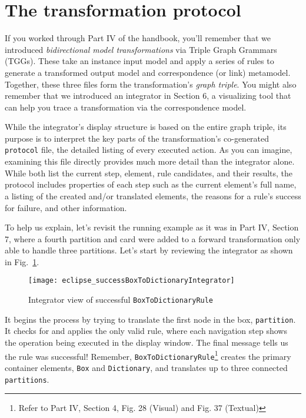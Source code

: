 \newpage

\section{The transformation protocol}

\genHeader

If you worked through Part IV of the handbook, you'll remember that we introduced \emph{bidirectional model transformations} via Triple Graph Grammars
(TGGs). These take an instance input model and apply a series of rules to generate a transformed output model and correspondence (or link) metamodel.
Together, these three files form the transformation's \emph{graph triple}. You might also remember that we introduced an integrator in
Section 6, a visualizing tool that can help you trace a transformation via the correspondence model. 

While the integrator's display structure is based on the entire graph triple, its purpose is to interpret the key parts of the transformation's co-generated
\texttt{protocol} file, the detailed listing of every executed action. As you can imagine, examining this file directly provides much more detail than the
integrator alone. While both list the current step, element, rule candidates, and their results, the protocol includes properties of each step such as the
current element's full name, a listing of the created and/or translated elements, the reasons for a rule's success for failure, and other information.

To help us explain, let's revisit the running example as it was in Part IV, Section 7, where a fourth partition and card were added to a forward
transformation only able to handle three partitions. Let's start by reviewing the integrator as shown in Fig.~\ref{eclipse:integratorFWD}.

\begin{figure}[htbp]
\begin{center} 
  \texttt{[image: eclipse\_successBoxToDictionaryIntegrator]}
  \caption{Integrator view of successful \texttt{BoxToDictionaryRule}}  
  \label{eclipse:integratorFWD}
\end{center}
\end{figure}

It begins the process by trying to translate the first node in the box, \texttt{part\-it\-ion}. It checks for and applies the only valid rule, where each
navigation step shows the operation being executed in the display window. The final message tells us the rule was successful! Remember,
\texttt{BoxToDictionaryRule}\footnote{Refer to Part IV, Section 4, Fig. 28 (Visual) and Fig. 37 (Textual)} creates the primary container elements, \texttt{Box}
and \texttt{Dictionary}, and translates up to three connected \texttt{partitions}.

